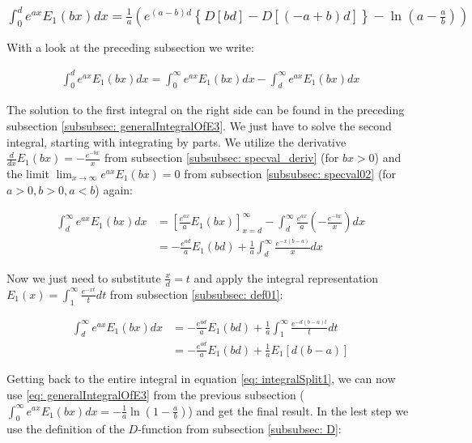 \documentclass[bibliography=totocnumbered]{scrartcl}
\begin{document}
	\subsubsection[A integral of E1, involving the exponential function]{$\int_{0}^{d}e^{ax}E_1\left(bx\right)dx=\frac{1}{a}\left(e^{\left(a-b\right)d}\left\{D\left[bd\right]-D\left[\left(-a+b\right)d\right]\right\}-\ln{\left(a-\frac{a}{b}\right)}\right)$}
	
	With a look at the preceding subsection we write:
	
	\begin{gather}
		\int_{0}^{d}e^{ax}E_1\left(bx\right)dx=\int_{0}^{\infty}e^{ax}E_1\left(bx\right)dx-\int_{d}^{\infty}e^{ax}E_1\left(bx\right)dx\label{eq: integralSplit1}
	\end{gather}
	
	The solution to the first integral on the right side can be found in the preceding subsection \ref{subsubsec: generalIntegralOfE3}. We just have to solve the second integral, starting with integrating by parts. We utilize the derivative $\frac{d}{dx}E_1\left(bx\right)=-\frac{e^{-bx}}{x}$ from subsection \ref{subsubsec: specval_deriv} (for $bx>0$) and the limit $\lim_{x\rightarrow\infty}e^{ax}E_1\left(bx\right)=0$ from subsection \ref{subsubsec: specval02} (for $a>0, b>0, a<b$) again:
	
	\begin{align}
		\int_{d}^{\infty}e^{ax}E_1\left(bx\right)dx&=\left[\frac{e^{ax}}{a}E_1\left(bx\right)\right]^{\infty}_{x=d}-\int_{d}^{\infty}\frac{e^{ax}}{a}\left(-\frac{e^{-bx}}{x}\right)dx\\
		&=-\frac{e^{ad}}{a}E_1\left(bd\right)+\frac{1}{a}\int_{d}^{\infty}\frac{e^{-x\left(b-a\right)}}{x}dx
	\end{align}
	
	Now we just need to substitute $\frac{x}{d}=t$ and apply the integral representation $E_1\left(x\right)=\int_{1}^{\infty}\frac{e^{-xt}}{t}dt$ from subsection \ref{subsubsec: def01}:
	
	\begin{align}
		\int_{d}^{\infty}e^{ax}E_1\left(bx\right)dx&=-\frac{e^{ad}}{a}E_1\left(bd\right)+\frac{1}{a}\int_{1}^{\infty}\frac{e^{-d\left(b-a\right)t}}{t}dt\\
		&=-\frac{e^{ad}}{a}E_1\left(bd\right)+\frac{1}{a}E_1\left[d\left(b-a\right)\right]
	\end{align}
	
	Getting back to the entire integral in equation \eqref{eq: integralSplit1}, we can now use \eqref{eq: generalIntegralOfE3} from the previous subsection ($\int_{0}^{\infty}e^{ax}E_1\left(bx\right)dx=-\frac{1}{a}\ln\left(1-\frac{a}{b}\right)$) and get the final result. In the lest step we use the definition of the $D$-function from subsection \ref{subsubsec: D}:
	
\end{document}
